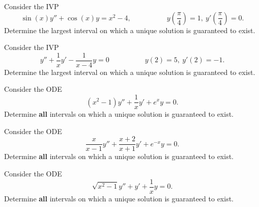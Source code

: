 \begin{applicationActivities}
\begin{activity}{5}
Consider the IVP
\[ \sin(x)y''+\cos(x)y= x^2-4, \hspace{5em} y\left(\frac{\pi}{4}\right)=1,\ y'\left(\frac{\pi}{4}\right)=0.\]
Determine the largest interval on which a unique solution is guaranteed to exist.
\end{activity}

\begin{activity}{5}
Consider the IVP
\[ y''+\frac{1}{x}y'-\frac{1}{x-4}y=0 \hspace{5em} y\left(2\right)=5,\ y'\left(2\right)=-1.\]
Determine the largest interval on which a unique solution is guaranteed to exist.
\end{activity}


\begin{activity}{5}
Consider the ODE
\[ (x^2-1)y'' + \frac{1}{x}y' + e^x y = 0.\]
Determine \textbf{all} intervals on which a unique solution is guaranteed to exist.
\end{activity}


\begin{activity}{5}
Consider the ODE
\[ \frac{x}{x-1}y'' + \frac{x+2}{x+1}y' + e^{-x} y = 0.\]
Determine \textbf{all} intervals on which a unique solution is guaranteed to exist.
\end{activity}


\begin{activity}{5}
Consider the ODE
\[ \sqrt{x^2-1} y'' + y' + \frac{1}{x} y = 0.\]
Determine \textbf{all} intervals on which a unique solution is guaranteed to exist.
\end{activity}




\end{applicationActivities}
